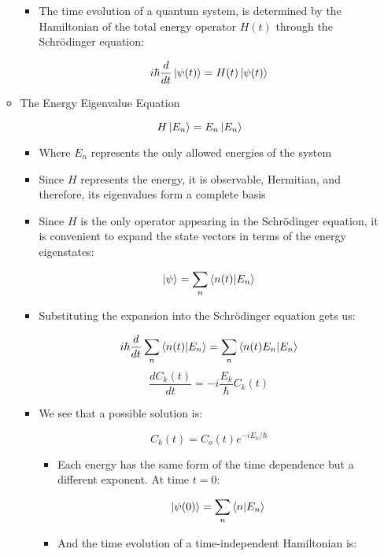 \begin{itemize}
\begin{itemize}
\begin{itemize}
          \item The time evolution of a quantum system, is determined by the Hamiltonian of the total energy operator $H(t)$ through the Schr\"odinger equation:

            $$i\hbar\frac{d}{dt}\ket{\psi(t)}=H(t)\ket{\psi(t)}$$

        \end{itemize}

      \item The Energy Eigenvalue Equation

        $$H\ket{E_n}=E_n\ket{E_n}$$

        \begin{itemize}

          \item Where $E_n$ represents the only allowed energies of the system

          \item Since $H$ represents the energy, it is observable, Hermitian, and therefore, its eigenvalues form a complete basis

          \item Since $H$ is the only operator appearing in the Schr\"odinger equation, it is convenient to expand the state vectors in terms of the energy eigenstates:

            $$\ket{\psi}=\sum_{n}\bra{n(t)}\ket{E_n}$$

          \item Substituting the expansion into the Schr\"odinger equation gets us:

            $$i\hbar\frac{d}{dt}\sum_n \bra{n(t)}\ket{E_n}=\sum_n\bra{n(t)E_n}\ket{E_n}$$
            $$\frac{d C_k(t)}{dt}=- i\frac{E_k}{\hbar}C_k(t)$$

          \item We see that a possible solution is:

            $$C_k(t)=C_o(t)e^{-iE_k/\hbar}$$

            \begin{itemize}

              \item Each energy has the same form of the time dependence but a different exponent. At time $t=0$:

                $$\ket{\psi(0)}=\sum_n\bra{n}\ket{E_n}$$

              \item And the time evolution of a time-independent Hamiltonian is:


\end{itemize}
\end{itemize}
\end{itemize}
\end{itemize}
